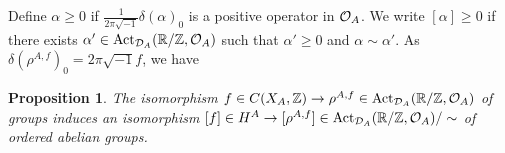 \documentclass[11pt]{article}
\newtheorem{proposition}[theorem]{Proposition}
\theoremstyle{plain}
\theoremstyle{definition}
\numberwithin{equation}{section}
\newcommand{\Z}{\mathbb{Z}}
\begin{document}
Define 
$\alpha \geq 0$ if 
$\frac{1}{2\pi\sqrt{-1}}\delta(\alpha)_0 $ is a positive operator in ${{\mathcal{O}}_A}$. 
We write
$[\alpha]\geq 0$ 
if there exists $\alpha' \in {{\operatorname{Act}_{{{\mathcal{D}}_A}}(\mathbb{R}/{\mathbb{Z}},{{\mathcal{O}}_A})}}$ such that
$\alpha'\geq 0$ and $\alpha \sim \alpha'$. 
As
$\delta(\rho^{A,f})_0 = 2\pi\sqrt{-1} f$,
we have
\begin{proposition}\label{prop:HACT}
The isomorphism
$f \in C(X_A,\Z) \rightarrow \rho^{A,f} \in \ActA$
of groups induces an isomorphism
$[f] \in H^A\rightarrow [\rho^{A,f}] \in {{\operatorname{Act}_{{{\mathcal{D}}_A}}(\mathbb{R}/{\mathbb{Z}},{{\mathcal{O}}_A})}}/\sim$
 of ordered abelian groups.
\end{proposition}

\end{document}
